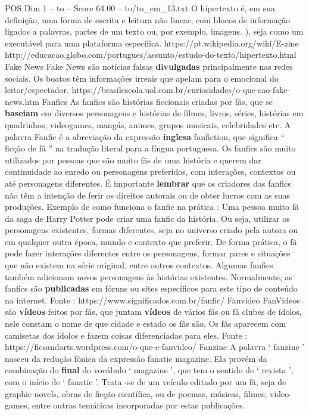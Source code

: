 \begin{textsample}{POS Dim 1 – to – Score 64.00 – to/to\_em\_13.txt}
O hipertexto é, em sua definição, uma forma de escrita e leitura não linear, com blocos de informação ligados a palavras, partes de um texto ou, por exemplo, imagens. ), seja como um executável para uma plataforma específica. https://pt.wikipedia.org/wiki/E-zine http://educacao.globo.com/portugues/assunto/estudo-do-texto/hipertexto.html Fake News Fake News são notícias falsas \textbf{divulgadas} principalmente nas redes sociais.
Os boatos têm informações irreais que apelam para o emocional do leitor/espectador. https://brasilescola.uol.com.br/curiosidades/o-que-sao-fake-news.htm Fanfics As fanfics são histórias ficcionais criadas por fãs, que se \textbf{baseiam} em diversos personagens e histórias de filmes, livros, séries, histórias em quadrinhos, videogames, mangás, animes, grupos musicais, celebridades etc.
A palavra Fanfic é a abreviação da expressão \textbf{inglesa} fanfiction, que significa “ ficção de fã ” na tradução literal para a língua portuguesa.
Os fanfics são muito utilizados por pessoas que são muito fãs de uma história e querem dar continuidade ao enredo ou personagens preferidos, com interações, contextos ou até personagens diferentes.
É importante \textbf{lembrar} que os criadores das fanfics não têm a intenção de ferir os direitos autorais ou de obter lucros com as suas produções.
Exemplo de como funciona o fanfic na prática : Uma pessoa muito fã da saga de Harry Potter pode criar uma fanfic da história.
Ou seja, utilizar os personagens existentes, formas diferentes, seja no universo criado pela autora ou em qualquer outra época, mundo e contexto que preferir.
De forma prática, o fã pode fazer interações diferentes entre os personagens, formar pares e situações que não existem na série original, entre outros contextos.
Algumas fanfics também adicionam novos personagens às histórias existentes.
Normalmente, as fanfics são \textbf{publicadas} em fóruns ou sites específicos para este tipo de conteúdo na internet.
Fonte : https://www.significados.com.br/fanfic/ Fanvídeo FanVideos são \textbf{vídeos} feitos por fãs, que juntam \textbf{vídeos} de vários fãs ou fã clubes de ídolos, nele constam o nome de que cidade e estado os fãs são.
Os fãs aparecem com camisetas dos ídolos e fazem coisas diferenciadas para eles.
Fonte : https://ficsandarts.wordpress.com/o-que-e-fanvideo/ Fanzine A palavra ‘ fanzine ’ nasceu da redução fônica da expressão fanatic magazine.
Ela provém da combinação do \textbf{final} do vocábulo ‘ magazine ’, que tem o sentido de ‘ revista ’, com o início de ‘ fanatic ’.
Trata -se de um veículo editado por um fã, seja de graphic novels, obras de ficção científica, ou de poemas, músicas, filmes, vídeo-games, entre outras temáticas incorporadas por estas publicações.

\end{textsample}
